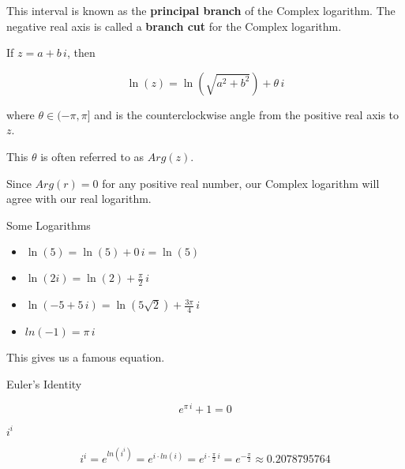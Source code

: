 \documentclass{ximera}
\begin{document}
This interval is known as the \textbf{principal branch} of the Complex logarithm.  The negative real axis is called a \textbf{branch cut} for the Complex logarithm.





\begin{definition}

If $z = a + b \, i$, then 

\[   \ln(z) = \ln(\sqrt{a^2 + b^2}) + \theta \, i       \]



where $\theta \in (-\pi, \pi]$ and is the counterclockwise angle from the positive real axis to $z$.



This $\theta$ is often referred to as $Arg(z)$.



\end{definition}




Since $Arg(r) = 0$ for any positive real number, our Complex logarithm will agree with our real logarithm.








\begin{example} Some Logarithms


\begin{itemize}
\item $\ln(5) = \ln(5) + 0 \, i = \ln(5)$

\item $\ln(2i) = \ln(2) + \frac{\pi}{2} \, i$

\item $\ln(-5 + 5 \, i) = \ln(5 \sqrt{2}) + \frac{3\pi}{4}\, i$

\item $ln(-1) = \pi \, i$



\end{itemize}




\end{example}




This gives us a famous equation.



\begin{theorem} Euler's Identity

\[  e^{\pi \, i} + 1 = 0       \]

\end{theorem}









\begin{example}  $i^i$


\[    i^i =  e^{ln(i^i)} = e^{i \cdot ln(i)} = e^{ i \cdot \tfrac{\pi}{2} \, i}   = e^{-\tfrac{\pi}{2}} \approx  0.2078795764\]






\end{example}
\end{document}
